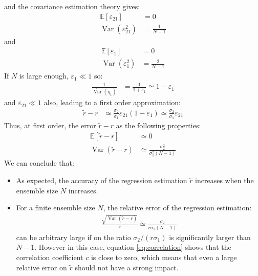 \documentclass[12pt]{scrartcl}
\DeclareMathOperator{\Var}{Var}
\begin{document}
and the covariance estimation theory gives:
\begin{subequations}
\begin{align}
\mathbb{E}\left[\varepsilon_{21}\right] & = 0 \\
\Var\left(\varepsilon_{21}^2\right) & = \frac{1}{N-1}
\end{align}
\end{subequations}
and 
\begin{subequations}
\begin{align}
\mathbb{E}\left[\varepsilon_1\right] & = 0 \\
\Var\left(\varepsilon_1^2\right) & = \frac{2}{N-1}
\end{align}
\end{subequations}
If $N$ is large enough, $\varepsilon_1 \ll 1$ so:
\begin{align}
\frac{1}{\widetilde{\Var}\left(\eta_1\right)} & = \frac{1}{1 + \varepsilon_1} \simeq 1 - \varepsilon_1
\end{align}
and $\varepsilon_{21} \ll 1$ also, leading to a first order approximation:
\begin{align}
\widetilde{r} - r & \simeq \frac{\sigma_2}{\sigma_1} \varepsilon_{21} \left(1 - \varepsilon_1\right) \simeq \frac{\sigma_2}{\sigma_1} \varepsilon_{21}
\end{align}
Thus, at first order, the error $\widetilde{r} - r$ as the following properties:
\begin{subequations}
\begin{align}
\mathbb{E}\left[\widetilde{r} - r\right] & \simeq 0 \\
\Var\left(\widetilde{r} - r\right) & \simeq \frac{\sigma_2^2}{\sigma_1^2 (N-1)}
\end{align}
\end{subequations}
We can conclude that:
\begin{itemize}
\item As expected, the accuracy of the regression estimation $\widetilde{r}$ increases when the ensemble size $N$ increases.
\item For a finite ensemble size $N$, the relative error of the regression estimation:
\begin{align}
\frac{\sqrt{\Var\left(\widetilde{r} - r\right)}}{r} \simeq \frac{\sigma_2}{r \sigma_1 (N-1)}
\end{align}
can be arbitrary large if on the ratio $\sigma_2 / (r\sigma_1)$ is significantly larger than $N-1$. However in this case, equation \eqref{eq:correlation} shows that the correlation coefficient $c$ is close to zero, which means that even a large relative error on $\widetilde{r}$ should not have a strong impact.
\end{itemize}
\end{document}
